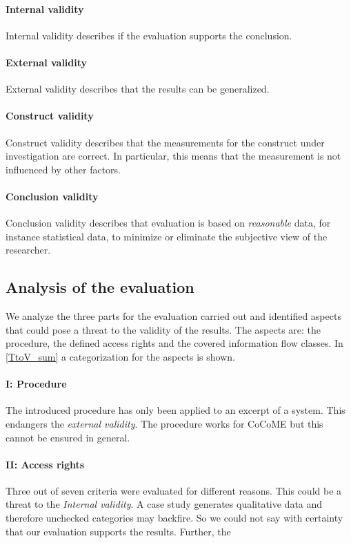\paragraph{Internal validity}
Internal validity describes if the evaluation supports the conclusion. 
\paragraph{External validity}
External validity describes that the results can be generalized.
\paragraph{Construct validity}
Construct validity describes that the measurements for the construct under investigation are correct. In particular, this means that the measurement is not influenced by other factors.
\paragraph{Conclusion validity}
Conclusion validity describes that evaluation is based on \textit{reasonable} data, for instance statistical data, to minimize or eliminate the subjective view of the researcher.
\subsection{Analysis of the evaluation}
We analyze the three parts for the evaluation carried out and identified aspects that could pose a threat to the validity of the results. The aspects are: the procedure, the defined access rights and the covered information flow classes. In \autoref{TtoV_sum} a categorization for the aspects is shown.
\paragraph{I: Procedure}
The introduced procedure has only been applied to an excerpt of a system. This endangers the \textit{external validity}. The procedure works for CoCoME but this cannot be ensured in general.
\paragraph{II: Access rights}
Three out of seven criteria were evaluated for different reasons. This could be a threat to the \textit{Internal validity}. A case study generates qualitative data and therefore unchecked categories may backfire. So we could not say with certainty that our evaluation supports the results. Further, the %
